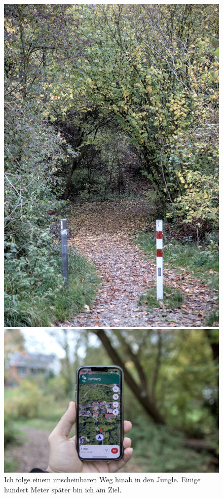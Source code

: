 \begin{figure}[h]
    \centering
    \begin{minipage}{.4\textwidth}
        \centering
        \includegraphics[width=.7\linewidth]{figures/geocaching/first/IMG_3096.jpg}
    \end{minipage}%
    \begin{minipage}{.6\textwidth}
        \centering
        \includegraphics[width=\linewidth]{figures/geocaching/first/IMG_3098.jpg}
    \end{minipage}
    \caption{Ich folge einem unscheinbaren Weg hinab in den Jungle. Einige hundert Meter später bin ich am Ziel.}
    \label{first-cache-ziel}
\end{figure}

